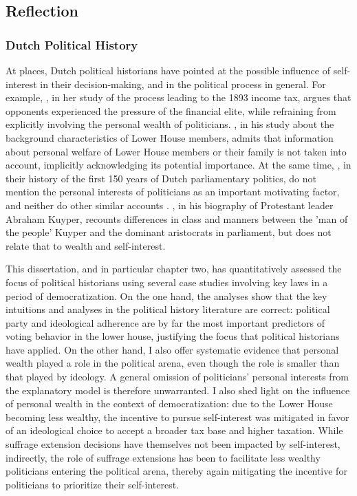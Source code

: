 \subsection{Reflection}\label{sec:reflection}

\subsubsection{Dutch Political History}

At places, Dutch political historians have pointed at the possible influence of self-interest in their decision-making, and in the political process in general. For example, \cite{smit2002omwille}, in her study of the process leading to the 1893 income tax, argues that opponents experienced the pressure of the financial elite, while refraining from explicitly involving the personal wealth of politicians. \cite{van1983toegang}, in his study about the background characteristics of Lower House members, admits that information about personal welfare of Lower House members or their family is not taken into account, implicitly acknowledging its potential importance. At the same time, \cite{van2013eerste}, in their history of the first 150 years of Dutch parliamentary politics, do not mention the personal interests of politicians as an important motivating factor, and neither do other similar accounts \cite{de2003het, de2014ons}. \cite{koch2020abraham}, in his biography of Protestant leader Abraham Kuyper, recounts differences in class and manners between the 'man of the people' Kuyper and the dominant aristocrats in parliament, but does not relate that to wealth and self-interest. 

This dissertation, and in particular chapter two, has quantitatively assessed the focus of political historians using several case studies involving key laws in a period of democratization. On the one hand, the analyses show that the key intuitions and analyses in the political history literature are correct: political party and ideological adherence are by far the most important predictors of voting behavior in the lower house, justifying the focus that political historians have applied. On the other hand, I also offer systematic evidence that personal wealth played a role in the political arena, even though the role is smaller than that played by ideology. A general omission of politicians' personal interests from the explanatory model is therefore unwarranted. I also shed light on the influence of personal wealth in the context of democratization: due to the Lower House becoming less wealthy, the incentive to pursue self-interest was mitigated in favor of an ideological choice to accept a broader tax base and higher taxation. While suffrage extension decisions have themselves not been impacted by self-interest, indirectly, the role of suffrage extensions has been to facilitate less wealthy politicians entering the political arena, thereby again mitigating the incentive for politicians to prioritize their self-interest. 

